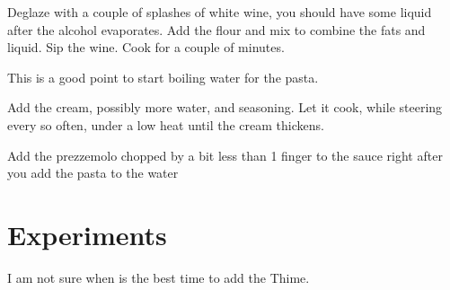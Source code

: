 Deglaze with a couple of splashes of white wine, you should have some liquid after the alcohol evaporates.
%
Add the flour and mix to combine the fats and liquid. Sip the wine. Cook for a couple of minutes.

This is a good point to start boiling water for the pasta.

Add the cream, possibly more water, and seasoning. 
%
%
Let it cook, while steering every so often, under a low heat until the cream thickens.

Add the prezzemolo chopped by a bit less than 1 finger to the sauce right after you add the pasta to the water

\section{Experiments}

I am not sure when is the best time to add the Thime.